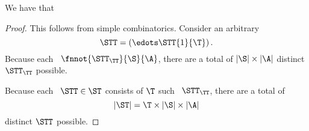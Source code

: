 \begin{proposition}
  We have that %
\end{proposition}

\begin{proof}
  This follows from simple combinatorics.
  Consider an arbitrary \str
  $$\STT = \left(\edots\STT{1}{\T}\right).$$
  Because each \stpstr\ $\fnnot{\STT_\TT}{\S}{\A}$,
  there are a total of $|\S| \times |\A|$ distinct $\STT_\TT$ possible.

  Because each \str\ $\STT \in \ST$ consists of $\T$ such \stpstrs\ $\STT_\TT$,
  there are a total of 
  $$|\ST| = \T \times |\S| \times |\A|$$
  distinct $\STT$ possible.
\end{proof}
